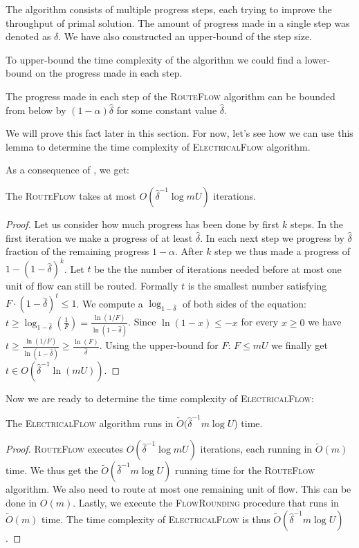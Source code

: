 The algorithm consists of multiple progress steps, each trying to improve the throughput of primal solution. The amount of progress made in a single step was denoted as $\delta$. We have also constructed an upper-bound of the step size.

To upper-bound the time complexity of the algorithm we could find a lower-bound on the progress made in each step.
\begin{lemma}\label{lemma_step_bound}
The progress made in each step of the \textsc{RouteFlow} algorithm can be bounded from below by $(1-\alpha)\hat{\delta}$ for some constant value $\hat{\delta}$.
\end{lemma}
We will prove this fact later in this section. For now, let's see how we can use this lemma to determine the time complexity of \textsc{ElectricalFlow} algorithm.

As a consequence of , we get:
\begin{lemma}
The \textsc{RouteFlow} takes at most $O(\hat{\delta}^{-1}\log mU)$ iterations.
\end{lemma}
\begin{proof}
Let us consider how much progress has been done by first $k$ steps. In the first iteration we make a progress of at least $\hat\delta$. In each next step we progress by $\hat\delta$ fraction of the remaining progress $1-\alpha$. After $k$ step we thus made a progress of $1-(1-\hat\delta)^k$.
Let $t$ be the the number of iterations needed before at most one unit of flow can still be routed. Formally $t$ is the smallest number satisfying $F\cdot(1-\hat\delta)^t \le  1$.
We compute a $\log_{1-\hat\delta}$ of both sides of the equation: $t \ge \log_{1-\hat\delta}(\frac{1}{F}) = \frac{\ln(1/F)}{\ln(1-\hat\delta)}$.
Since $\ln(1-x) \le -x$ for every $x\ge 0$ we have $t \ge \frac{\ln(1/F)}{\ln(1-\hat\delta)} \ge \frac{\ln(F)}{\hat\delta}$. Using the upper-bound for $F$: $F \le mU$ we finally get $t \in O(\hat\delta^{-1}\ln(mU))$.
\end{proof}

Now we are ready to determine the time complexity of \textsc{ElectricalFlow}:
\begin{theorem}
\label{time_complexity_flow}
The \textsc{ElectricalFlow} algorithm runs in $\tilde  O(\hat{\delta}^{-1}m\log U$) time.
\end{theorem}
\begin{proof}
\textsc{RouteFlow} executes $O(\hat{\delta}^{-1}\log mU)$ iterations, each running in $\tilde O(m)$ time. We thus get the $\tilde O(\hat{\delta}^{-1}m\log U)$ running time for the \textsc{RouteFlow} algorithm. We also need to route at most one remaining unit of flow. This can be done in $O(m)$. Lastly, we execute the \textsc{FlowRounding} procedure that runs in $\tilde O(m)$ time. The time complexity of \textsc{ElectricalFlow} is thus $\tilde  O(\hat{\delta}^{-1}m\log U)$.
\end{proof}

